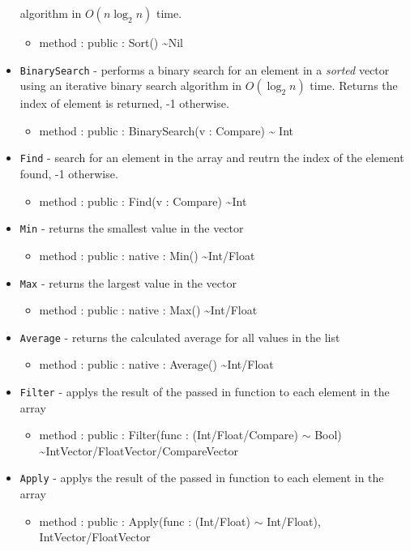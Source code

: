 \documentclass[11pt]{article}
\begin{document}
\begin{itemize}
  algorithm in $O(n \log_2 n)$ time.
  \begin{itemize}
  \item method : public : Sort() \textasciitilde Nil
  \end{itemize}
\item \texttt{BinarySearch} - performs a binary search for an element
  in a \emph{sorted} vector using an iterative binary search algorithm
  in $O(\log_2 n)$ time. Returns the index of element is returned, -1
  otherwise.
  \begin{itemize}
  \item method : public : BinarySearch(v : Compare) \textasciitilde
    Int
  \end{itemize}
\item \texttt{Find} - search for an element in the array and reutrn
  the index of the element found, -1 otherwise.
  \begin{itemize}
  \item method : public : Find(v : Compare) \textasciitilde Int
  \end{itemize}
\item \texttt{Min} - returns the smallest value in the vector
  \begin{itemize}
  \item method : public : native : Min() \textasciitilde Int/Float
  \end{itemize}
\item \texttt{Max} - returns the largest value in the vector
  \begin{itemize}
  \item method : public : native : Max() \textasciitilde Int/Float
  \end{itemize}
\item \texttt{Average} - returns the calculated average for all values
  in the list
  \begin{itemize}
  \item method : public : native : Average() \textasciitilde Int/Float
  \end{itemize}
\item \texttt{Filter} - applys the result of the passed in function to
  each element in the array
  \begin{itemize}
  \item method : public : Filter(func : (Int/Float/Compare) $\sim$
    Bool) \textasciitilde IntVector/FloatVector/CompareVector
  \end{itemize}
\item \texttt{Apply} - applys the result of the passed in function to
  each element in the array
  \begin{itemize}
  \item method : public : Apply(func : (Int/Float) $\sim$ Int/Float),
    IntVector/FloatVector
  \end{itemize}
\end{itemize}
\end{document}

